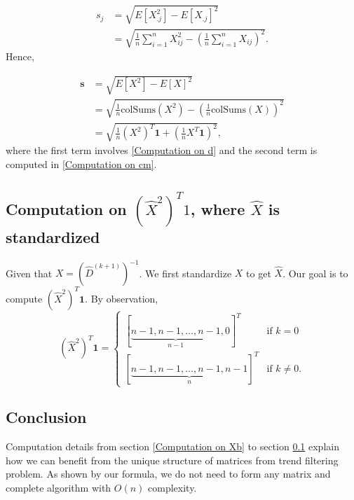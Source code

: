 \begin{align}
s_j & = \sqrt{E[X_{.j}^2] - E[X_{.j}]^2} \\
       & = \sqrt{\frac{1}{n}\sum_{i=1}^{n}X_{ij}^2 - (\frac{1}{n}\sum_{i=1}^{n} X_{ij})^2}.
\end{align}
Hence,

\begin{align}
\bm{s} & = \sqrt{E[X^2] - E[X]^2} \\
       & = \sqrt{\frac{1}{n}\text{colSums}(X^2) - (\frac{1}{n}\text{colSums}(X))^2} \\
       & = \sqrt{\frac{1}{n}(X^2)^T \bm{1} + (\frac{1}{n} X^T \bm{1})^2},
\end{align}
where the first term involves \ref{Computation on d} and the second term is computed in \ref{Computation on cm}.

\subsection{Computation on $(\hat{X}^2)^T 1$, where $\hat{X}$ is standardized} \label{Computation on std_d}

Given that $X = (\hat{D}^{(k+1)})^{-1}$. We first standardize $X$ to get $\hat{X}$. Our goal is to compute $(\hat{X}^2)^T \bm{1}$. By observation, 
\begin{equation}
(\hat{X}^2)^T \bm{1} = 
\begin{cases} 
      [\underbrace{n-1, n-1, \dots, n-1}_{n-1}, 0]^T & \text{if } k = 0 \\
      [\underbrace{n-1, n-1, \dots, n-1, n-1}_{n}]^T & \text{if } k \neq 0. 
\end{cases}
\end{equation}

\subsection{Conclusion}

Computation details from section \ref{Computation on Xb} to section \ref{Computation on std_d} explain how we can benefit from the unique structure of matrices from trend filtering problem. As shown by our formula, we do not need to form any matrix and complete \susie algorithm with $O(n)$ complexity. 
















